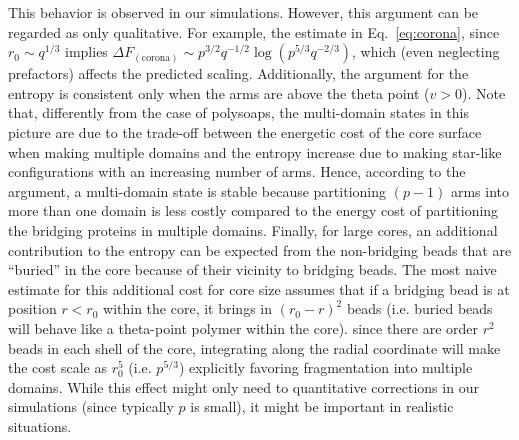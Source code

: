 \documentclass[
preprint,
a4paper,
12pt,
superscriptaddress,
pre]{revtex4}
\begin{document}
This behavior is observed in our simulations.  However, this argument
can be regarded as only qualitative. For example, the estimate in
Eq.~\eqref{eq:corona}, since $r_0 \sim q^{1/3}$ implies $ \Delta
F_\mathrm{(corona)} \sim p^{3/2}q^{-1/2} \log\left( p^{5/3}q^{-2/3}
\right)$, which (even neglecting prefactors) affects the predicted
scaling. Additionally, the argument for the entropy is consistent only
when the arms are above the theta point ($v>0$).
Note that, differently from the case of polysoaps, the multi-domain
states in this picture are due to the trade-off between the energetic
cost of the core surface when making multiple domains and the entropy
increase due to making star-like configurations with an increasing
number of arms.  Hence, according to the argument, a multi-domain
state is stable because partitioning $(p-1)$ arms into more than one
domain is less costly compared to the energy cost of partitioning the
bridging proteins in multiple domains.
Finally, for large cores, an additional contribution to the entropy
can be expected from the non-bridging beads that are ``buried'' in the
core because of their vicinity to bridging beads. The most naive
estimate for this additional cost for core size assumes that if a
bridging bead is at position $r<r_0$ within the core, it brings in
$(r_0 -r)^2$ beads (i.e. buried beads will behave like a theta-point
polymer within the core). since there are order $r^2$ beads in each
shell of the core, integrating along the radial coordinate will make
the cost scale as $r_0^5$ (i.e. $p^{5/3}$) explicitly favoring
fragmentation into multiple domains. While this effect might only need
to quantitative corrections in our simulations (since typically $p$ is
small), it might be important in realistic situations.
\end{document}
